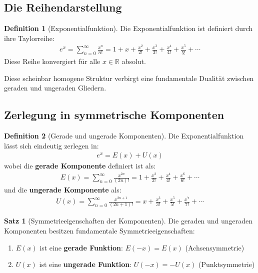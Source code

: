 ﻿\documentclass[a4paper,12pt]{article}
\theoremstyle{definition}
\newtheorem{definition}{Definition}
\newtheorem{satz}{Satz}
\begin{document}
\subsection{Die Reihendarstellung}

\begin{definition}[Exponentialfunktion]
Die Exponentialfunktion ist definiert durch ihre Taylorreihe:
\begin{align}
  e^x = \sum_{n=0}^{\infty} \frac{x^n}{n!}
      = 1 + x + \frac{x^2}{2!} + \frac{x^3}{3!} + \frac{x^4}{4!}
        + \frac{x^5}{5!} + \cdots
\end{align}
Diese Reihe konvergiert für alle $x \in \mathbb{R}$ absolut.
\end{definition}

Diese scheinbar homogene Struktur verbirgt eine fundamentale Dualität zwischen
geraden und ungeraden Gliedern.

\subsection{Zerlegung in symmetrische Komponenten}

\begin{definition}[Gerade und ungerade Komponenten]
Die Exponentialfunktion lässt sich eindeutig zerlegen in:
\begin{align}
  e^x = E(x) + U(x)
\end{align}
wobei die \textbf{gerade Komponente} definiert ist als:
\begin{align}
  E(x) = \sum_{n=0}^{\infty} \frac{x^{2n}}{(2n)!}
       = 1 + \frac{x^2}{2!} + \frac{x^4}{4!} + \frac{x^6}{6!} + \cdots
\end{align}
und die \textbf{ungerade Komponente} als:
\begin{align}
  U(x) = \sum_{n=0}^{\infty} \frac{x^{2n+1}}{(2n+1)!}
       = x + \frac{x^3}{3!} + \frac{x^5}{5!} + \frac{x^7}{7!} + \cdots
\end{align}
\end{definition}

\begin{satz}[Symmetrieeigenschaften der Komponenten]
Die geraden und ungeraden Komponenten besitzen fundamentale
Symmetrieeigenschaften:
\begin{enumerate}
  \item $E(x)$ ist eine \textbf{gerade Funktion}: $E(-x) = E(x)$
        (Achsensymmetrie)
  \item $U(x)$ ist eine \textbf{ungerade Funktion}: $U(-x) = -U(x)$
        (Punktsymmetrie)
\end{enumerate}
\end{satz}
\end{document}
